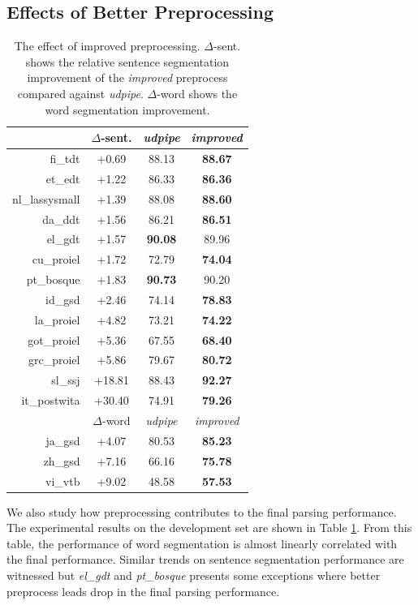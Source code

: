 \documentclass[11pt,a4paper]{article}
\begin{document}
\subsection{Effects of Better Preprocessing}
\begin{table}[t]
  \centering
  \small
  \begin{tabular}{rccc}
     & $\Delta$-sent. & \textit{udpipe} & \textit{improved} \\
    \hline
    fi\_tdt & +0.69 & 88.13 & \textbf{88.67} \\
    et\_edt & +1.22 & 86.33 & \textbf{86.36} \\
    nl\_lassysmall & +1.39 & 88.08 & \textbf{88.60} \\
    da\_ddt & +1.56 & 86.21 & \textbf{86.51} \\
    el\_gdt & +1.57 & \textbf{90.08} & 89.96  \\
    cu\_proiel & +1.72 & 72.79 & \textbf{74.04} \\
    pt\_bosque & +1.83 & \textbf{90.73} & 90.20 \\
    id\_gsd & +2.46 & 74.14 & \textbf{78.83} \\
    la\_proiel & +4.82 & 73.21 & \textbf{74.22} \\
    got\_proiel & +5.36 & 67.55 & \textbf{68.40} \\
    grc\_proiel & +5.86 & 79.67 & \textbf{80.72} \\
    sl\_ssj & +18.81& 88.43 & \textbf{92.27} \\
    it\_postwita & +30.40 &74.91 & \textbf{79.26} \\
    \hline
    \hline
    & $\Delta$-word & \textit{udpipe} & \textit{improved} \\
    ja\_gsd & +4.07 & 80.53 & \textbf{85.23} \\
    zh\_gsd & +7.16 & 66.16 & \textbf{75.78} \\
    vi\_vtb & +9.02 & 48.58 & \textbf{57.53} \\
  \end{tabular}
\caption{The effect of improved preprocessing.
	$\Delta$-sent. shows the relative sentence segmentation improvement of the \textit{improved} preprocess compared against \textit{udpipe}.
	$\Delta$-word shows the word segmentation improvement.}\label{tbl:preprocess}
\end{table}

We also study how preprocessing contributes to the final parsing performance.
The experimental results on the development set are shown in Table \ref{tbl:preprocess}.
From this table, the performance of word segmentation
is almost linearly correlated with the final performance.
Similar trends on sentence segmentation performance are witnessed
but \textit{el\_gdt} and \textit{pt\_bosque} presents some exceptions
where better preprocess leads drop in the final parsing performance.
\end{document}

